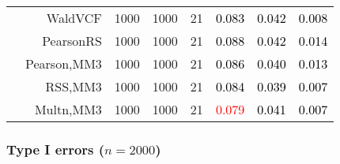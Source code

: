 \documentclass[
]{article}
\begin{document}
\begin{table}[H]
{\begin{tabular}[t]{lrrrrrrr}
\hspace{1em} & WaldVCF & 1000 & 1000 & 21 & \textcolor{black}{0.083} & \textcolor{black}{0.042} & \textcolor{black}{0.008}\\

\hspace{1em} & PearsonRS & 1000 & 1000 & 21 & \textcolor{black}{0.088} & \textcolor{black}{0.042} & \textcolor{black}{0.014}\\

\hspace{1em} & Pearson,MM3 & 1000 & 1000 & 21 & \textcolor{black}{0.086} & \textcolor{black}{0.040} & \textcolor{black}{0.013}\\

\hspace{1em} & RSS,MM3 & 1000 & 1000 & 21 & \textcolor{black}{0.084} & \textcolor{black}{0.039} & \textcolor{black}{0.007}\\

\hspace{1em} & Multn,MM3 & 1000 & 1000 & 21 & \textcolor{red}{0.079} & \textcolor{black}{0.041} & \textcolor{black}{0.007}\\
\bottomrule
\end{tabular}}
\endgroup{}
\end{table}

\hypertarget{type-i-errors-n2000}{%
\subsubsection{\texorpdfstring{Type I errors
(\(n=2000\))}{Type I errors (n=2000)}}\label{type-i-errors-n2000}}
\end{document}

